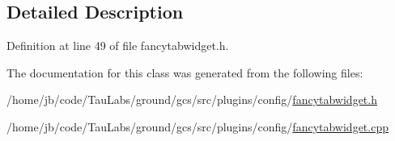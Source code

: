 \subsection{\-Detailed \-Description}


\-Definition at line 49 of file fancytabwidget.\-h.



\-The documentation for this class was generated from the following files\-:\begin{DoxyCompactItemize}
\item 
/home/jb/code/\-Tau\-Labs/ground/gcs/src/plugins/config/\hyperlink{config_2fancytabwidget_8h}{fancytabwidget.\-h}\item 
/home/jb/code/\-Tau\-Labs/ground/gcs/src/plugins/config/\hyperlink{config_2fancytabwidget_8cpp}{fancytabwidget.\-cpp}\end{DoxyCompactItemize}

